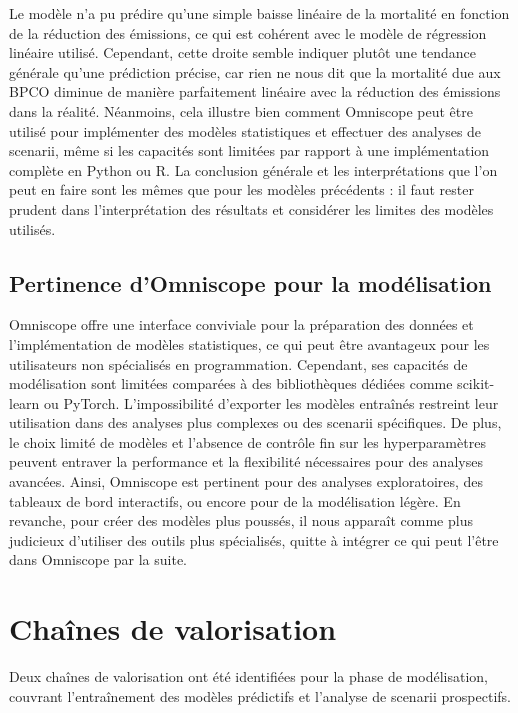 \documentclass[11pt,a4paper]{article}
\begin{document}
Le modèle n'a pu prédire qu'une simple baisse linéaire de la mortalité en fonction de la réduction des émissions, ce qui est cohérent avec le modèle de régression linéaire utilisé. Cependant, cette droite semble indiquer plutôt une tendance générale qu'une prédiction précise, car rien ne nous dit que la mortalité due aux BPCO diminue de manière parfaitement linéaire avec la réduction des émissions dans la réalité. Néanmoins, cela illustre bien comment Omniscope peut être utilisé pour implémenter des modèles statistiques et effectuer des analyses de scenarii, même si les capacités sont limitées par rapport à une implémentation complète en Python ou R. La conclusion générale et les interprétations que l'on peut en faire sont les mêmes que pour les modèles précédents : il faut rester prudent dans l'interprétation des résultats et considérer les limites des modèles utilisés.

\subsection{Pertinence d'Omniscope pour la modélisation}

Omniscope offre une interface conviviale pour la préparation des données et l'implémentation de modèles statistiques, ce qui peut être avantageux pour les utilisateurs non spécialisés en programmation. Cependant, ses capacités de modélisation sont limitées comparées à des bibliothèques dédiées comme scikit-learn ou PyTorch. L'impossibilité d'exporter les modèles entraînés restreint leur utilisation dans des analyses plus complexes ou des scenarii spécifiques. De plus, le choix limité de modèles et l'absence de contrôle fin sur les hyperparamètres peuvent entraver la performance et la flexibilité nécessaires pour des analyses avancées. Ainsi, Omniscope est pertinent pour des analyses exploratoires, des tableaux de bord interactifs, ou encore pour de la modélisation légère. En revanche, pour créer des modèles plus poussés, il nous apparaît comme plus judicieux d'utiliser des outils plus spécialisés, quitte à intégrer ce qui peut l'être dans Omniscope par la suite.


\section{Chaînes de valorisation}

Deux chaînes de valorisation ont été identifiées pour la phase de modélisation, couvrant l'entraînement des modèles prédictifs et l'analyse de scenarii prospectifs.
\end{document}
